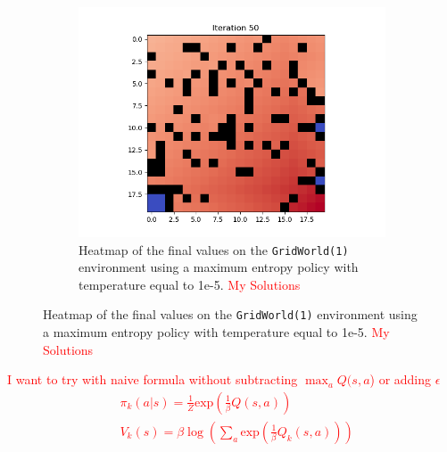 \documentclass{article}
\begin{document}
\begin{enumerate}[(a)]
\begin{figure}[h!]
\begin{subfigure}{0.3\textwidth}
    \end{subfigure}
    \hspace{0.1 in}
     \begin{subfigure}{0.3\textwidth}
        \centering
        \includegraphics[width=\textwidth]{figures/part_1_b_t1e-5_grid1.png}
        \caption{Heatmap of the final values on the \texttt{GridWorld(1)} environment using a maximum entropy policy with temperature equal to 1e-5.  \textcolor{red}{My Solutions}}
    \end{subfigure}
\end{figure}

\textcolor{red}{I want to try with naive formula without subtracting $\max_a Q(s,a$) or adding $\epsilon$}
\textcolor{red}{
\begin{align*}
	&\pi_k(a|s) = \frac{1}{Z}  \text{exp}  \left(\frac{1}{\beta}Q(s,a) \right)\\
	&V_k(s) = \beta \log \left( \sum_a \text{exp} \left( \frac{1}{\beta}Q_k(s,a) \right)\right)
\end{align*}
}


\end{enumerate}
\end{document}
